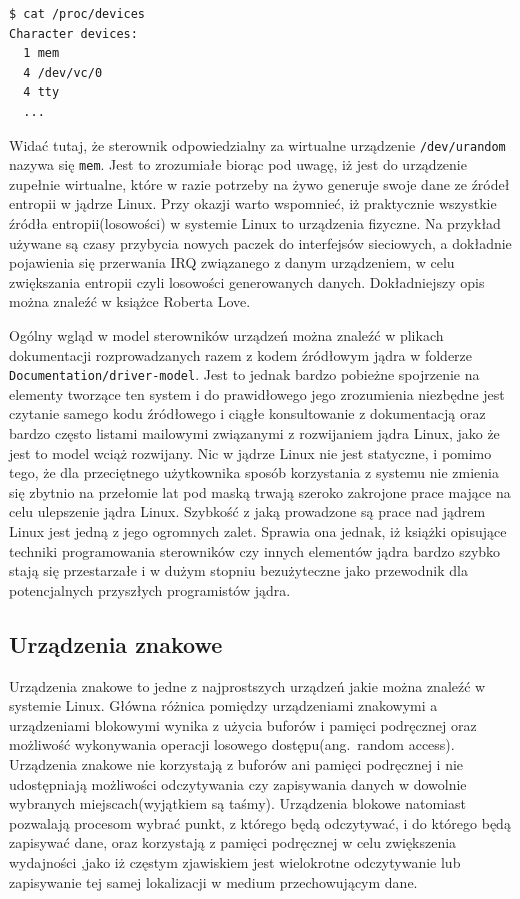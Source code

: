 \documentclass[11pt]{scrartcl}
\begin{document}
\begin{verbatim}
$ cat /proc/devices
Character devices:
  1 mem
  4 /dev/vc/0
  4 tty
  ...
\end{verbatim}

Widać tutaj, że sterownik odpowiedzialny za wirtualne urządzenie \texttt{/dev/urandom} nazywa się \texttt{mem}. Jest to zrozumiałe biorąc pod uwagę, iż jest do urządzenie zupełnie wirtualne, które w razie potrzeby na żywo generuje swoje dane ze źródeł entropii w jądrze Linux.  Przy okazji warto wspomnieć, iż praktycznie wszystkie źródła entropii(losowości) w systemie Linux to urządzenia fizyczne. Na przykład używane są czasy przybycia nowych paczek do interfejsów sieciowych, a dokładnie pojawienia się przerwania IRQ związanego z danym urządzeniem, w celu zwiększania entropii czyli losowości generowanych danych.  Dokładniejszy opis można znaleźć w książce Roberta Love\cite{linuxkerneldevel}.

Ogólny wgląd w model sterowników urządzeń można znaleźć w plikach dokumentacji rozprowadzanych razem z kodem źródłowym jądra w folderze \newline\texttt{Documentation/driver-model}. Jest to jednak bardzo pobieżne spojrzenie na elementy tworzące ten system i do prawidłowego jego zrozumienia niezbędne jest czytanie samego kodu źródłowego i ciągłe konsultowanie z dokumentacją oraz bardzo często listami mailowymi związanymi z rozwijaniem jądra Linux, jako że jest to model wciąż rozwijany. Nic w jądrze Linux nie jest statyczne, i pomimo tego, że dla przeciętnego użytkownika sposób korzystania z systemu nie zmienia się zbytnio na przełomie lat pod maską trwają szeroko zakrojone prace mające na celu ulepszenie jądra Linux. Szybkość z jaką prowadzone są prace nad jądrem Linux jest jedną z jego ogromnych zalet. Sprawia ona jednak, iż książki opisujące techniki programowania sterowników czy innych elementów jądra bardzo szybko stają się przestarzałe i w dużym stopniu bezużyteczne jako przewodnik dla potencjalnych przyszłych programistów jądra.

\subsection{Urządzenia znakowe}
\label{chardevs}

Urządzenia znakowe to jedne z najprostszych urządzeń jakie można znaleźć w systemie Linux. Główna różnica pomiędzy urządzeniami znakowymi a urządzeniami blokowymi wynika z użycia buforów i pamięci podręcznej oraz możliwość wykonywania operacji losowego dostępu(ang.\ random access).  Urządzenia znakowe nie korzystają z buforów ani pamięci podręcznej i nie udostępniają możliwości odczytywania czy zapisywania danych w dowolnie wybranych miejscach(wyjątkiem są taśmy). Urządzenia blokowe natomiast pozwalają procesom wybrać punkt, z którego będą odczytywać, i do którego będą zapisywać dane, oraz korzystają z pamięci podręcznej w celu zwiększenia wydajności ,jako iż częstym zjawiskiem jest wielokrotne odczytywanie lub zapisywanie tej samej lokalizacji w medium przechowującym dane.
\end{document}
